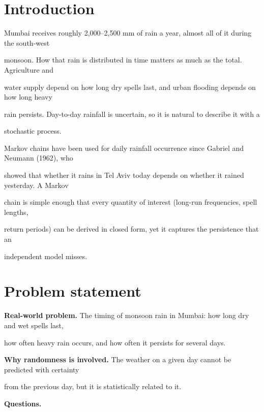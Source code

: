 \documentclass[11pt,a4paper]{article}
\begin{document}
\section{Introduction}\label{introduction}



Mumbai receives roughly 2,000--2,500 mm of rain a year, almost all of it during the south-west

monsoon. How that rain is distributed in time matters as much as the total. Agriculture and

water supply depend on how long dry spells last, and urban flooding depends on how long heavy

rain persists. Day-to-day rainfall is uncertain, so it is natural to describe it with a

stochastic process.



Markov chains have been used for daily rainfall occurrence since Gabriel and Neumann (1962), who

showed that whether it rains in Tel Aviv today depends on whether it rained yesterday. A Markov

chain is simple enough that every quantity of interest (long-run frequencies, spell lengths,

return periods) can be derived in closed form, yet it captures the persistence that an

independent model misses.



\section{Problem statement}\label{problem-statement}



\textbf{Real-world problem.} The timing of monsoon rain in Mumbai: how long dry and wet spells last,

how often heavy rain occurs, and how often it persists for several days.



\textbf{Why randomness is involved.} The weather on a given day cannot be predicted with certainty

from the previous day, but it is statistically related to it.



\textbf{Questions.}
\end{document}
